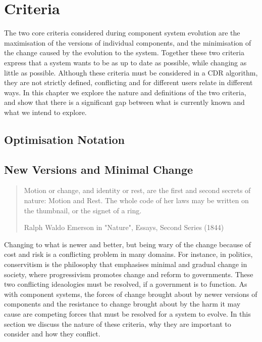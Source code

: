 \chapter{Criteria}
{}The two core criteria considered during component system evolution are the maximisation of the versions of individual components, 
{}and the minimisation of the change caused by the evolution to the system.
{}Together these two criteria express that a system wants to be as up to date as possible, while changing as little as possible.
{}Although these criteria must be considered in a CDR algorithm,
{}they are not strictly defined, conflicting and for different users relate in different ways.
{}In this chapter we explore the nature and definitions of the two criteria,
{}and show that there is a significant gap between what is currently known and what we intend to explore. 

\section{Optimisation Notation}



\section{New Versions and Minimal Change}
\begin{quotation}
Motion or change, and identity or rest, are the first and second secrets of nature: Motion and Rest. 
The whole code of her laws may be written on the thumbnail, or the signet of a ring.

Ralph Waldo Emerson in "Nature", Essays, Second Series (1844)
\end{quotation}

Changing to what is newer and better, but being wary of the change because of cost and risk is a conflicting problem in many domains.
For instance, in politics, conservitism is the philosophy that emphasises minimal and gradual change in society, %
where progressivism promotes change and reform to governments.
These two conflicting ideaologies must be resolved, if a government is to function. 
As with component systems, 
the forces of change brought about by newer versions of components and the resistance to change brought about by the harm it may cause
are competing forces that must be resolved for a system to evolve.
In this section we discuss the nature of these criteria, why they are important to consider and how they conflict.


